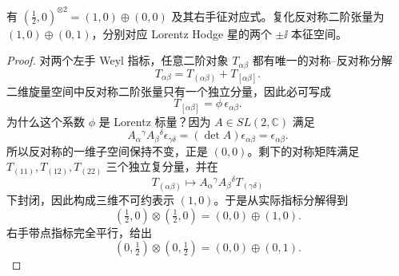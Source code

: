 \begin{proposition}[同手征旋量与二形式分解]
有 $(\tfrac12,0)^{\otimes2}=(1,0)\oplus(0,0)$ 及其右手征对应式。复化反对称二阶张量为 $(1,0)\oplus(0,1)$，分别对应 Lorentz Hodge 星的两个 $\pm\ii$ 本征空间。
\end{proposition}
\begin{proof}
对两个左手 Weyl 指标，任意二阶对象 $T_{\alpha\beta}$ 都有唯一的对称--反对称分解
\begin{equation*}
 T_{\alpha\beta}=T_{(\alpha\beta)}+T_{[\alpha\beta]}.
\end{equation*}
二维旋量空间中反对称二阶张量只有一个独立分量，因此必可写成
\begin{equation*}
 T_{[\alpha\beta]}=\phi\,\epsilon_{\alpha\beta}.
\end{equation*}
为什么这个系数 $\phi$ 是 Lorentz 标量？因为 $A\in SL(2,\mathbb C)$ 满足
\begin{equation*}
 A_\alpha{}^\gamma A_\beta{}^\delta
 \epsilon_{\gamma\delta}
 =(\det A)\epsilon_{\alpha\beta}
 =\epsilon_{\alpha\beta}.
\end{equation*}
所以反对称的一维子空间保持不变，正是 $(0,0)$。剩下的对称矩阵满足
$T_{(11)},T_{(12)},T_{(22)}$ 三个独立复分量，并在
\begin{equation*}
 T_{(\alpha\beta)}\longmapsto
 A_\alpha{}^\gamma A_\beta{}^\delta
 T_{(\gamma\delta)}
\end{equation*}
下封闭，因此构成三维不可约表示 $(1,0)$。于是从实际指标分解得到
\begin{equation*}
 (\tfrac12,0)\otimes(\tfrac12,0)
 =(0,0)\oplus(1,0).
\end{equation*}
右手带点指标完全平行，给出
\begin{equation*}
 (0,\tfrac12)\otimes(0,\tfrac12)
 =(0,0)\oplus(0,1).
\end{equation*}


\end{proof}

